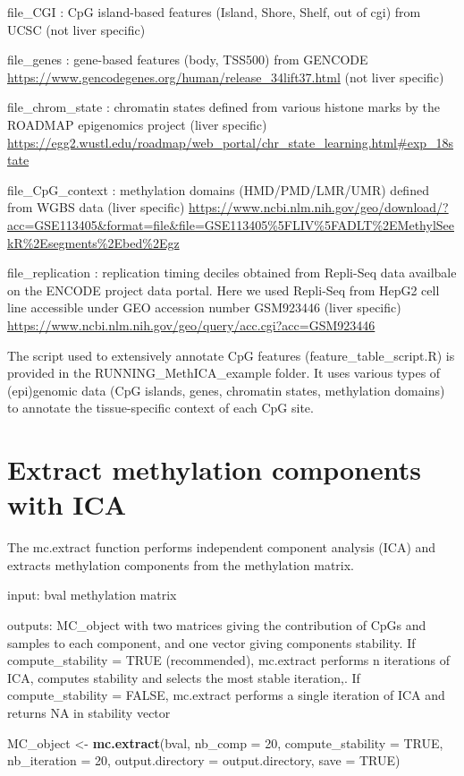\documentclass[]{article}
\newenvironment{Shaded}{\begin{snugshade}}{\end{snugshade}}
\newcommand{\DataTypeTok}[1]{\textcolor[rgb]{0.13,0.29,0.53}{#1}}
\newcommand{\DecValTok}[1]{\textcolor[rgb]{0.00,0.00,0.81}{#1}}
\newcommand{\KeywordTok}[1]{\textcolor[rgb]{0.13,0.29,0.53}{\textbf{#1}}}
\newcommand{\NormalTok}[1]{#1}
\newcommand{\OtherTok}[1]{\textcolor[rgb]{0.56,0.35,0.01}{#1}}
\newcommand{\StringTok}[1]{\textcolor[rgb]{0.31,0.60,0.02}{#1}}
\begin{document}
file\_CGI : CpG island-based features (Island, Shore, Shelf, out of cgi)
from UCSC (not liver specific)

file\_genes : gene-based features (body, TSS500) from GENCODE
\url{https://www.gencodegenes.org/human/release_34lift37.html} (not
liver specific)

file\_chrom\_state : chromatin states defined from various histone marks
by the ROADMAP epigenomics project (liver specific)
\url{https://egg2.wustl.edu/roadmap/web_portal/chr_state_learning.html\#exp_18state}

file\_CpG\_context : methylation domains (HMD/PMD/LMR/UMR) defined from
WGBS data (liver specific)
\url{https://www.ncbi.nlm.nih.gov/geo/download/?acc=GSE113405\&format=file\&file=GSE113405\%5FLIV\%5FADLT\%2EMethylSeekR\%2Esegments\%2Ebed\%2Egz}

file\_replication : replication timing deciles obtained from Repli-Seq
data availbale on the ENCODE project data portal. Here we used Repli-Seq
from HepG2 cell line accessible under GEO accession number GSM923446
(liver specific)
\url{https://www.ncbi.nlm.nih.gov/geo/query/acc.cgi?acc=GSM923446}

The script used to extensively annotate CpG features
(feature\_table\_script.R) is provided in the RUNNING\_MethICA\_example
folder. It uses various types of (epi)genomic data (CpG islands, genes,
chromatin states, methylation domains) to annotate the tissue-specific
context of each CpG site.

\hypertarget{extract-methylation-components-with-ica}{%
\section{Extract methylation components with
ICA}\label{extract-methylation-components-with-ica}}

The mc.extract function performs independent component analysis (ICA)
and extracts methylation components from the methylation matrix.

input: bval methylation matrix

outputs: MC\_object with two matrices giving the contribution of CpGs
and samples to each component, and one vector giving components
stability. If compute\_stability = TRUE (recommended), mc.extract
performs n iterations of ICA, computes stability and selects the most
stable iteration,. If compute\_stability = FALSE, mc.extract performs a
single iteration of ICA and returns NA in stability vector

\begin{Shaded}
\begin{Highlighting}[]
\NormalTok{MC_object <-}\StringTok{ }\KeywordTok{mc.extract}\NormalTok{(bval, }\DataTypeTok{nb_comp =} \DecValTok{20}\NormalTok{, }\DataTypeTok{compute_stability =} \OtherTok{TRUE}\NormalTok{, }\DataTypeTok{nb_iteration =} \DecValTok{20}\NormalTok{, }\DataTypeTok{output.directory =}\NormalTok{ output.directory, }\DataTypeTok{save =} \OtherTok{TRUE}\NormalTok{)}
\end{Highlighting}
\end{Shaded}
\end{document}
